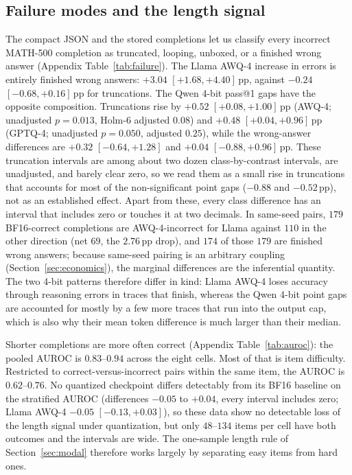 \documentclass[11pt,a4paper]{article}
\begin{document}
\subsection{Failure modes and the length signal}
\label{sec:failure}
The compact JSON and the stored completions let us classify every incorrect MATH-500 completion as truncated, looping, unboxed, or a finished wrong answer (Appendix Table~\ref{tab:failure}). The Llama AWQ-4 increase in errors is entirely finished wrong answers: $+3.04$ $[+1.68,+4.40]$\,pp, against $-0.24$ $[-0.68,+0.16]$\,pp for truncations. The Qwen 4-bit pass@1 gaps have the opposite composition. Truncations rise by $+0.52$ $[+0.08,+1.00]$\,pp (AWQ-4; unadjusted $p=0.013$, Holm-6 adjusted $0.08$) and $+0.48$ $[+0.04,+0.96]$\,pp (GPTQ-4; unadjusted $p=0.050$, adjusted $0.25$), while the wrong-answer differences are $+0.32$ $[-0.64,+1.28]$ and $+0.04$ $[-0.88,+0.96]$\,pp. These truncation intervals are among about two dozen class-by-contrast intervals, are unadjusted, and barely clear zero, so we read them as a small rise in truncations that accounts for most of the non-significant point gaps ($-0.88$ and $-0.52$\,pp), not as an established effect. Apart from these, every class difference has an interval that includes zero or touches it at two decimals. In same-seed pairs, $179$ BF16-correct completions are AWQ-4-incorrect for Llama against $110$ in the other direction (net $69$, the $2.76$\,pp drop), and $174$ of those $179$ are finished wrong answers; because same-seed pairing is an arbitrary coupling (Section~\ref{sec:economics}), the marginal differences are the inferential quantity. The two 4-bit patterns therefore differ in kind: Llama AWQ-4 loses accuracy through reasoning errors in traces that finish, whereas the Qwen 4-bit point gaps are accounted for mostly by a few more traces that run into the output cap, which is also why their mean token difference is much larger than their median.

Shorter completions are more often correct (Appendix Table~\ref{tab:auroc}): the pooled AUROC is $0.83$--$0.94$ across the eight cells. Most of that is item difficulty. Restricted to correct-versus-incorrect pairs within the same item, the AUROC is $0.62$--$0.76$. No quantized checkpoint differs detectably from its BF16 baseline on the stratified AUROC (differences $-0.05$ to $+0.04$, every interval includes zero; Llama AWQ-4 $-0.05$ $[-0.13,+0.03]$), so these data show no detectable loss of the length signal under quantization, but only $48$--$134$ items per cell have both outcomes and the intervals are wide. The one-sample length rule of Section~\ref{sec:modal} therefore works largely by separating easy items from hard ones.
\end{document}
